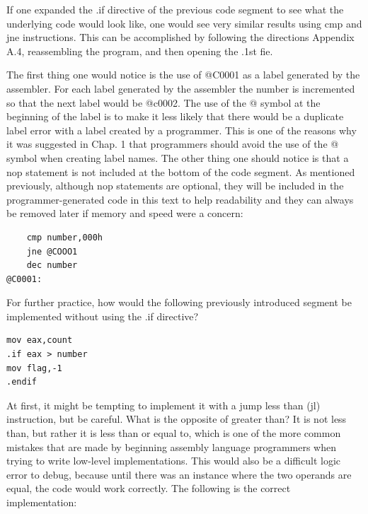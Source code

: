 \documentclass[10pt]{book}
\begin{document}
If one expanded the .if directive of the previous code segment to see what the underlying code would look like, one would see very similar results using cmp and jne instructions. This can be accomplished by following the directions Appendix A.4, reassembling the program, and then opening the .1st fie.

The first thing one would notice is the use of @C0001 as a label generated by the assembler. For each label generated by the assembler the number is incremented so that the next label would be @c0002. The use of the @ symbol at the beginning of the label is to make it less likely that there would be a duplicate label error with a label created by a programmer. This is one of the reasons why it was suggested in Chap. 1 that programmers should avoid the use of the @ symbol when creating label names. The other thing one should notice is that a nop statement is not included at the bottom of the code segment. As mentioned previously, although nop statements are optional, they will be included in the programmer-generated code in this text to help readability and they can always be removed later if memory and speed were a concern:

\begin{verbatim}
    cmp number,000h
    jne @COOO1
    dec number
@C0001:
\end{verbatim}

For further practice, how would the following previously introduced segment be implemented without using the .if directive?


\begin{verbatim}
mov eax,count
.if eax > number
mov flag,-1
.endif
\end{verbatim}

At first, it might be tempting to implement it with a jump less than (jl) instruction, but be careful. What is the opposite of greater than? It is not less than, but rather it is less than or equal to, which is one of the more common mistakes that are made by beginning assembly language programmers when trying to write low-level implementations. This would also be a difficult logic error to debug, because until there was an instance where the two operands are equal, the code would work correctly. The following is the correct implementation:
\end{document}
